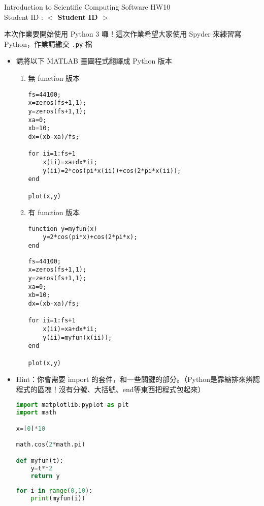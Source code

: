 \documentclass[12pt,a4paper]{article}
\newcommand{\placeholder}[1]{\textbf{$<$ #1 $>$}}
\newcommand{\idnumber}{\placeholder{Student ID}}
\begin{document}
\begin{CJK}{UTF8}{bsmi}
\begin{flushleft}Introduction to Scientific Computing Software HW10
\\Student ID : \idnumber{}\end{flushleft}

本次作業要開始使用 Python 3 囉！這次作業希望大家使用 Spyder 來練習寫 Python，作業請繳交 \texttt{.py} 檔
\begin{itemize}
\item 請將以下 MATLAB 畫圖程式翻譯成 Python 版本
\begin{enumerate}
\item 無 function 版本
\begin{lstlisting}[frame=single,caption=prob1.m]
fs=44100; 
x=zeros(fs+1,1);
y=zeros(fs+1,1);
xa=0;
xb=10;
dx=(xb-xa)/fs;

for ii=1:fs+1
    x(ii)=xa+dx*ii;
    y(ii)=2*cos(pi*x(ii))+cos(2*pi*x(ii));
end

plot(x,y)
\end{lstlisting}
\item 有 function 版本
\begin{lstlisting}[frame=single,caption=myfun.m]
function y=myfun(x)
    y=2*cos(pi*x)+cos(2*pi*x);
end
\end{lstlisting}
\begin{lstlisting}[frame=single,caption=prob2.m]
fs=44100; 
x=zeros(fs+1,1);
y=zeros(fs+1,1);
xa=0;
xb=10;
dx=(xb-xa)/fs;

for ii=1:fs+1
    x(ii)=xa+dx*ii;
    y(ii)=myfun(x(ii));
end

plot(x,y)
\end{lstlisting}

\end{enumerate}
\newpage
\item Hint：你會需要 import 的套件，和一些關鍵的部分。（Python是靠縮排來辨認程式的區塊！沒有分號、大括號、end等東西把程式包起來）
\begin{lstlisting}[frame=single,caption=prob1.py,language=Python]
import matplotlib.pyplot as plt
import math

x=[0]*10

math.cos(2*math.pi)

def myfun(t):
    y=t**2
    return y
    
for i in range(0,10):
    print(myfun(i))
\end{lstlisting}
\end{itemize}
\end{CJK}
\end{document}
